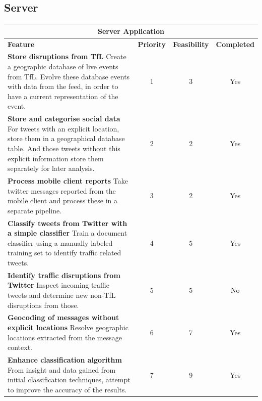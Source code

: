 \subsection{Server}

\begin{center}
\begin{tabular}{ | p{8.5cm} | c | c | c | }
\hline
\multicolumn{4}{|c|}{\textbf{Server Application}} \\ \hline
\textbf{Feature} & \textbf{Priority} & \textbf{Feasibility} & \textbf{Completed}
\\ \hline
\textbf{Store disruptions from TfL} \newline
Create a geographic database of live events from TfL. Evolve these database events with data from the feed, in order to have a current representation of the event. & 1 & 3 & Yes \\ \hline

\textbf{Store and categorise social data} \newline
For tweets with an explicit location, store them in a geographical database
table. And those tweets without this explicit information store them separately for later
analysis. & 2 & 2 & Yes \\ \hline

\textbf{Process mobile client reports} \newline
Take twitter messages reported from the mobile client and process these in a
separate pipeline. & 3 & 2 & Yes \\ \hline

\textbf{Classify tweets from Twitter with a simple classifier} \newline
Train a document classifier using a manually labeled training set to 
identify traffic related tweets. & 4 & 5 & Yes \\ \hline \hline

\textbf{Identify traffic disruptions from Twitter} \newline
Inspect incoming traffic tweets and determine new non-TfL disruptions from
those. & 5 & 5 & No \\ \hline

\textbf{Geocoding of messages without explicit locations} \newline
Resolve geographic locations extracted from the message context. & 6 & 7 & Yes \\ \hline

\textbf{Enhance classification algorithm} \newline
From insight and data gained from initial classification techniques, attempt to
improve the accuracy of the results. & 7 & 9 & Yes \\ \hline


\end{tabular}
\end{center}
